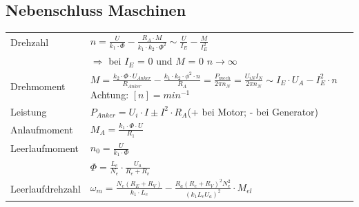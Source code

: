     \subsection{Nebenschluss Maschinen}
        \renewcommand{\arraystretch}{2}
        \begin{tabular}[c]{ | p{6cm} | p{9cm} |}
            \hline
            Drehzahl &
            $ n= \frac{U}{k_1 \cdot \Phi} - \frac{R_A \cdot M}{k_1 \cdot k_2 \cdot \Phi^2} \sim \frac{U}{I_E} - \frac{M}{I_E^2}$ \\ 
            &
            $\Longrightarrow $ bei $I_E$ = 0 und $M$ = 0 $n \rightarrow \infty$ \\
            \hline
            Drehmoment &
            $M=\frac{k_2 \cdot \Phi \cdot U_{Anker}}{R_{Anker}} - \frac{k_1 \cdot k_2 \cdot\phi^2 \cdot n}{R_A} =\frac{P_{mech}}{2\pi n_N}=\frac{U_{iN}I_N}{2\pi n_N}\sim I_E \cdot U_A - I_E ^2 \cdot n$
            \quad Achtung: $[n] = min^{-1}$\\
            \hline
            Leistung &
            $P_{Anker}= U_i \cdot I \pm I^2 \cdot R_A $(+ bei Motor; - bei Generator) \\
            \hline
            Anlaufmoment &
            $M_A = \frac{k_1 \cdot \Phi \cdot U}{R_1}$ \\
            \hline
            Leerlaufmoment &
            $n_0 = \frac{U}{k_1 \cdot \Phi}$ \\
            \hline
            & $\Phi=\frac{L_e}{N_e}\cdot\frac{U_a}{R_e+R_v}$\\
            \hline
            Leerlaufdrehzahl &
            $\omega_m=\frac{N_e\left(R_E+R_V\right)}{k_1\cdot
            L_e}-\frac{R_a\left(R_e+R_V\right)^2N_e^2}{\left(k_1L_eU_a\right)^2}\cdot
            M_{el}$\\
            \hline
        \end{tabular}
        \renewcommand{\arraystretch}{1.5}
        
